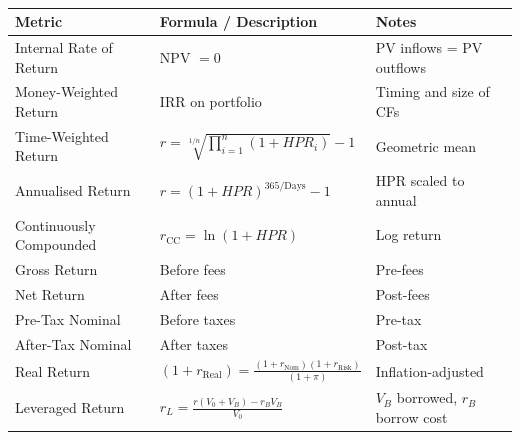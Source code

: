 \begin{definition} \\
\begin{tabular}{p{4.6cm}p{5.5cm}p{5cm}}
\hline
\textbf{Metric} & \textbf{Formula / Description} & \textbf{Notes} \\
\hline
Internal Rate of Return & NPV $= 0$ & PV inflows = PV outflows \\
\hline
Money-Weighted Return & IRR on portfolio & Timing and size of CFs \\
\hline
Time-Weighted Return & $r = \sqrt[1/n]{\prod\limits_{i=1}^n (1+HPR_i)} - 1$ & Geometric mean \\
\hline
Annualised Return & $r = (1+HPR)^{365/\text{Days}} - 1$ & HPR scaled to annual \\
\hline
Continuously Compounded & $r_{\text{CC}} = \ln(1+HPR)$ & Log return \\
\hline
Gross Return & Before fees & Pre-fees \\
\hline
Net Return & After fees & Post-fees \\
\hline
Pre-Tax Nominal & Before taxes & Pre-tax \\
\hline
After-Tax Nominal & After taxes & Post-tax \\
\hline
Real Return & $(1 + r_{\text{Real}}) = \frac{(1 + r_{\text{Nom}}) (1 + r_{\text{Risk}})}{(1 + \pi)}$ & Inflation-adjusted \\
\hline
Leveraged Return & $r_L = \frac{r(V_0 + V_B) - r_B V_B}{V_0}$ & $V_B$ borrowed, $r_B$ borrow cost \\
\hline
\end{tabular}
\end{definition}

